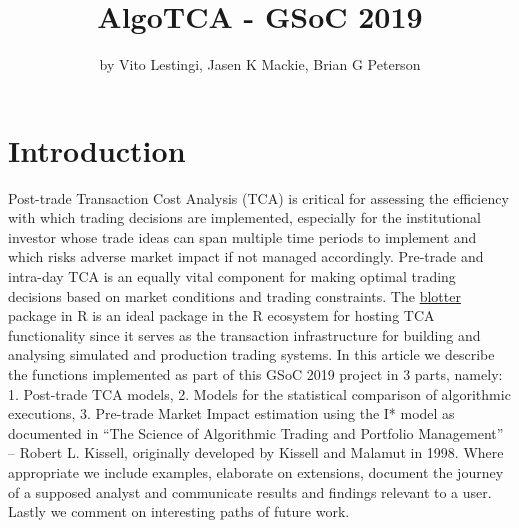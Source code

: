 \title{AlgoTCA - GSoC 2019}
\author{by Vito Lestingi, Jasen K Mackie, Brian G Peterson}

\maketitle



\hypertarget{introduction}{%
\section{Introduction}\label{introduction}}

Post-trade Transaction Cost Analysis (TCA) is critical for assessing the
efficiency with which trading decisions are implemented, especially for
the institutional investor whose trade ideas can span multiple time
periods to implement and which risks adverse market impact if not
managed accordingly. Pre-trade and intra-day TCA is an equally vital
component for making optimal trading decisions based on market
conditions and trading constraints. The
\href{https://github.com/braverock/blotter}{blotter} package in R is an
ideal package in the R ecosystem for hosting TCA functionality since it
serves as the transaction infrastructure for building and analysing
simulated and production trading systems. In this article we describe
the functions implemented as part of this GSoC 2019 project in 3 parts,
namely: 1. Post-trade TCA models, 2. Models for the statistical
comparison of algorithmic executions, 3. Pre-trade Market Impact
estimation using the I* model as documented in ``The Science of
Algorithmic Trading and Portfolio Management'' -- Robert L. Kissell,
originally developed by Kissell and Malamut in 1998. Where appropriate
we include examples, elaborate on extensions, document the journey of a
supposed analyst and communicate results and findings relevant to a
user. Lastly we comment on interesting paths of future work.

